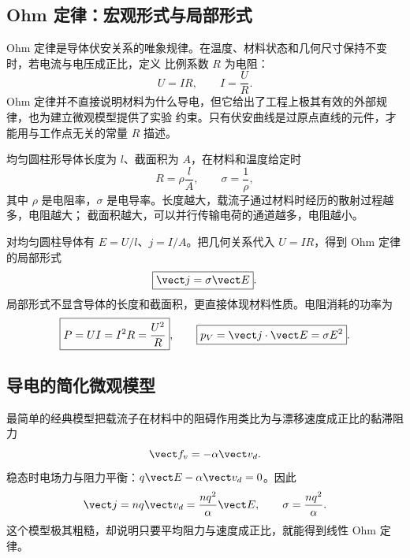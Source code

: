 \subsection*{Ohm 定律：宏观形式与局部形式}

Ohm 定律是导体伏安关系的唯象规律。在温度、材料状态和几何尺寸保持不变时，若电流与电压成正比，定义
比例系数 $R$ 为电阻：
\begin{equation}
  \boxed{U=IR},\qquad I=\frac UR.
\end{equation}
Ohm 定律并不直接说明材料为什么导电，但它给出了工程上极其有效的外部规律，也为建立微观模型提供了实验
约束。只有伏安曲线是过原点直线的元件，才能用与工作点无关的常量 $R$ 描述。

\ohmHistoryContextDiagram

均匀圆柱形导体长度为 $l$、截面积为 $A$，在材料和温度给定时
\begin{equation}
  \boxed{R=\rho\frac lA},\qquad \sigma=\frac1\rho,
\end{equation}
其中 $\rho$ 是电阻率，$\sigma$ 是电导率。长度越大，载流子通过材料时经历的散射过程越多，电阻越大；
截面积越大，可以并行传输电荷的通道越多，电阻越小。

\uniformResistorDiagram

对均匀圆柱导体有 $E=U/l$、$j=I/A$。把几何关系代入 $U=IR$，得到 Ohm 定律的局部形式
\begin{equation}
  \boxed{\vect j=\sigma\vect E}.
\end{equation}
局部形式不显含导体的长度和截面积，更直接体现材料性质。电阻消耗的功率为
\begin{equation}
  \boxed{P=UI=I^2R=\frac{U^2}{R}},
  \qquad
  \boxed{p_V=\vect j\cdot\vect E=\sigma E^2}.
\end{equation}

\subsection*{导电的简化微观模型}

最简单的经典模型把载流子在材料中的阻碍作用类比为与漂移速度成正比的黏滞阻力
\begin{equation}
  \vect f_v=-\alpha\vect v_d.
\end{equation}
稳态时电场力与阻力平衡：$q\vect E-\alpha\vect v_d=0$。因此
\begin{equation}
  \vect j=nq\vect v_d=\frac{nq^2}{\alpha}\vect E,
  \qquad
  \sigma=\frac{nq^2}{\alpha}.
\end{equation}
这个模型极其粗糙，却说明只要平均阻力与速度成正比，就能得到线性 Ohm 定律。

